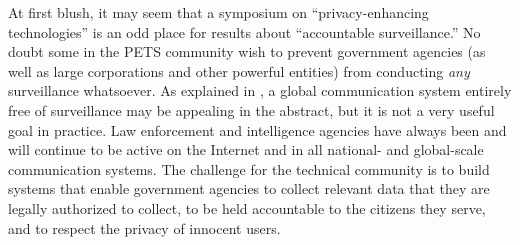 At first blush, it may seem that a symposium on ``privacy-enhancing 
technologies'' is an odd place for results about ``accountable surveillance.''
No doubt some in the PETS community wish to prevent government agencies 
(as well as large corporations and other powerful entities) from conducting 
{\it any} surveillance whatsoever.  As explained in \cite{sff-foci2014}, a 
global communication system entirely free of surveillance may be appealing in
the abstract, but it is not a very useful goal in practice.  Law enforcement
and intelligence agencies have always been and will continue to be active 
on the Internet and in all national- and global-scale communication systems.
The challenge for the technical community is to build systems that enable
government agencies to collect relevant data that they are legally authorized
to collect, to be held accountable to the citizens they serve, and to respect 
the privacy of innocent users.

